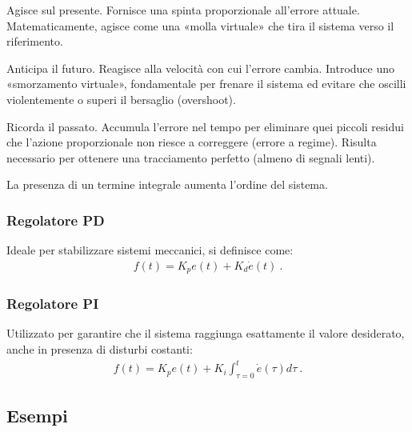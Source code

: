 \documentclass[letterpaper,10pt,italian]{jupyterBook}
\begin{document}
\sphinxAtStartPar
{} Agisce sul presente. Fornisce una spinta proporzionale all’errore attuale. Matematicamente, agisce come una «molla virtuale» che tira il sistema verso il riferimento.

\sphinxAtStartPar
{} Anticipa il futuro. Reagisce alla velocità con cui l’errore cambia. Introduce uno «smorzamento virtuale», fondamentale per frenare il sistema ed evitare che oscilli violentemente o superi il bersaglio (overshoot).

\sphinxAtStartPar
{} Ricorda il passato. Accumula l’errore nel tempo per eliminare quei piccoli residui che l’azione proporzionale non riesce a correggere (errore a regime). Risulta necessario per ottenere una tracciamento perfetto (almeno di segnali lenti).

\sphinxAtStartPar
La presenza di un termine integrale aumenta l’ordine del sistema.


\subsubsection{Regolatore PD}
\label{\detokenize{ch/control-intro:regolatore-pd}}\label{\detokenize{ch/control-intro:control-hs-intro-regulators-pd}}
\sphinxAtStartPar
Ideale per stabilizzare sistemi meccanici, si definisce come:
\begin{equation*}
\begin{split}f(t) = K_p e(t) + K_d \dot{e}(t) \ .\end{split}
\end{equation*}

\subsubsection{Regolatore PI}
\label{\detokenize{ch/control-intro:regolatore-pi}}\label{\detokenize{ch/control-intro:control-hs-intro-regulators-pi}}
\sphinxAtStartPar
Utilizzato per garantire che il sistema raggiunga esattamente il valore desiderato, anche in presenza di disturbi costanti:
\begin{equation*}
\begin{split}f(t) = K_p e(t) + K_i \int_{\tau=0}^{t} \dot{e}(\tau) d \tau \ .\end{split}
\end{equation*}

\subsection{Esempi}
\label{\detokenize{ch/control-intro:esempi}}\label{\detokenize{ch/control-intro:control-hs-intro-examples-first-order}}
\end{document}
